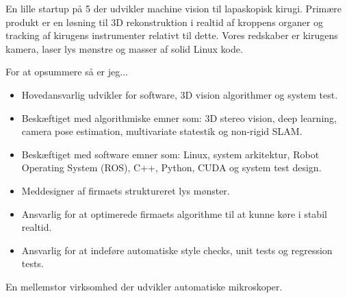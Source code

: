 \documentclass[10pt,a4paper,ragged2e]{altacv}
\begin{document}
\begin{fullwidth}
\makecvheader
\end{fullwidth}


En lille startup på 5 der udvikler machine vision til lapaskopisk kirugi. Primære produkt er en løsning til 3D rekonstruktion i realtid af kroppens organer og tracking af kirugens instrumenter relativt til dette. Vores redskaber er kirugens kamera, laser lys mønstre og masser af solid Linux kode.

\divider

For at opsummere så er jeg...
\begin{itemize}
  \item Hovedansvarlig udvikler for software, 3D vision algorithmer og system test.
  \item Beskæftiget med algorithmiske emner som: 3D stereo vision, deep learning, camera pose estimation, multivariate statestik og non-rigid SLAM.
  \item Beskæftiget med software emner som: Linux, system arkitektur, Robot Operating System (ROS), C++, Python, CUDA og system test design.
  \item Meddesigner af firmaets struktureret lys mønster.
  \item Ansvarlig for at optimerede firmaets algorithme til at kunne køre i stabil realtid.
  \item Ansvarlig for at indeføre automatiske style checks, unit tests og regression tests.
\end{itemize}

\divider

En mellemstor virksomhed der udvikler automatiske mikroskoper.

\divider
\end{document}
